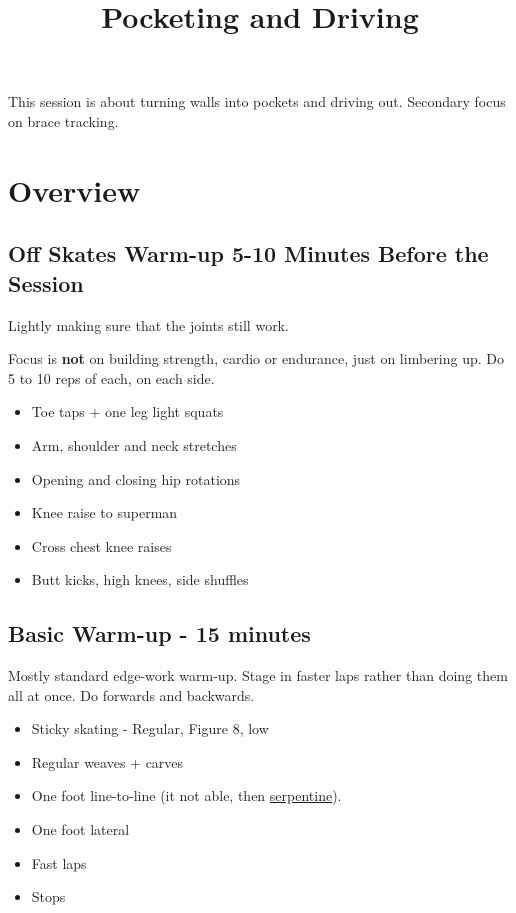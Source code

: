 \documentclass{journal}
\title{Pocketing and Driving}
\author{}
\begin{document}
\maketitle
\noindent 

This session is about turning walls into pockets and driving out. 
Secondary focus on brace tracking.

\section*{Overview}

\subsection*{Off Skates Warm-up 5-10 Minutes Before the Session}
Lightly making sure that the joints still work.

Focus is {\bf not} on building strength, cardio or endurance, just on limbering up. Do 5 to 10 reps of each, on each side. 

\begin{itemize}
\item Toe taps + one leg light squats
\item Arm, shoulder and neck stretches
\item Opening and closing hip rotations
\item Knee raise to superman 
\item Cross chest knee raises
\item Butt kicks, high knees, side shuffles
\end{itemize}


\subsection*{Basic Warm-up - 15 minutes}

Mostly standard edge-work warm-up. Stage in faster laps rather than doing them all at once.
Do forwards and backwards.

\begin{itemize}
\item Sticky skating - Regular, Figure 8, low
\item Regular weaves + carves
\item One foot line-to-line (it not able, then \hyperref[drill:one_foot/serpentine]{serpentine}). 
\item One foot lateral 
\item Fast laps 
\item Stops
\end{itemize}
\end{document}
